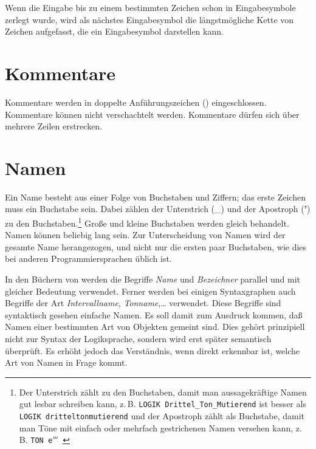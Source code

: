 Wenn  die Eingabe bis zu einem bestimmten Zeichen schon in Eingabesymbole
zerlegt  wurde,  wird als nächstes
Eingabesymbol die längstmögliche  Kette
von Zeichen aufgefasst, die ein Eingabesymbol darstellen kann.


\section{Kommentare}\label{sec:kommentare}
\label{zweizwei}

Kommentare werden in doppelte Anführungszeichen (\texttt{\dq})
eingeschlossen.
Kommentare  können  nicht
verschachtelt werden.
Kommentare dürfen sich über mehrere Zeilen erstrecken.

\section{Namen}\label{sec:namen}
\label{zweidrei}

Ein Name besteht aus einer Folge von
Buchstaben und Ziffern;  das
erste Zeichen muss ein Buchstabe sein.  Dabei zählen
der Unterstrich  (\_) und der Apostroph
(\textbf{'})
zu den Buchstaben.\footnote{Der Unterstrich zählt zu den Buchstaben, damit
man aussagekräftige Namen gut lesbar schreiben kann, z.\,B.
\texttt{LOGIK Drittel\_Ton\_Mutierend} ist besser als
\texttt{LOGIK dritteltonmutierend}
und der Apostroph zählt als Buchstabe,
damit man Töne mit einfach oder mehrfach gestrichenen
Namen versehen kann, z.\,B. \texttt{TON e${}'''$ }}
Große und kleine Buchstaben werden gleich behandelt.
Namen können beliebig lang sein.
Zur  Unterscheidung von Namen wird der gesamte Name herangezogen,
und nicht nur die ersten paar Buchstaben, wie dies bei anderen
Programmiersprachen üblich ist.

In den Büchern von \mutabor{} werden die Begriffe \emph{Name}
und \emph{Bezeichner}
parallel und mit gleicher Bedeutung verwendet. Ferner werden bei einigen
Syntaxgraphen auch Begriffe der Art \emph{Intervallname}, \emph{Tonname},\ldots
verwendet. Diese Begriffe sind syntaktisch gesehen einfache Namen.
Es soll damit zum Ausdruck kommen, daß Namen einer bestimmten Art von
Objekten gemeint sind. Dies gehört prinzipiell nicht zur Syntax der
Logiksprache, sondern wird erst später semantisch überprüft. Es erhöht
jedoch das Verständnis, wenn direkt erkennbar ist, welche Art von Namen
in Frage kommt.

